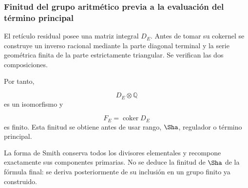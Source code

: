 \subsubsection{Finitud del grupo aritmético previa a la evaluación del término principal}
El retículo residual posee una matriz integral \(D_E\). Antes de tomar su cokernel se construye un inverso racional mediante la parte diagonal terminal y la serie geométrica finita de la parte estrictamente triangular. Se verifican las dos composiciones.\par
{}
Por tanto,\par
\[
D_E\otimes\mathbb Q
\]
es un isomorfismo y\par
\[
F_E=\operatorname{coker}D_E
\]
es finito. Esta finitud se obtiene antes de usar rango, \(\Sha\), regulador o término principal.\par
La forma de Smith conserva todos los divisores elementales y recompone exactamente sus componentes primarias. No se deduce la finitud de \(\Sha\) de la fórmula final: se deriva posteriormente de su inclusión en un grupo finito ya construido.\par
{}
